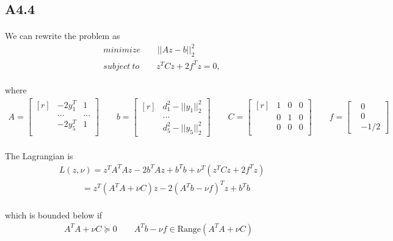 \subsection*{A4.4}
\paragraph{}
We can rewrite the problem as
\begin{align*}
&minimize \qquad ||Az - b||_2^2\\
&subject\ to \qquad z^TCz + 2f^Tz = 0,
\end{align*}
\paragraph{}
where
\begin{align*}
A = \begin{bmatrix*}[r]
&-2y_1^T & 1 \\ &...&...\\&-2y_5^T&1\\
\end{bmatrix*} \qquad b = \begin{bmatrix*}[r]
&d_1^2 - ||y_1||^2_2 \\ &... \\&d_5^2 - ||y_5||^2_2 
\end{bmatrix*}\qquad C = \begin{bmatrix*}[r]
&1 &0 &0 \\&0 &1 &0\\ &0 &0 &0\\
\end{bmatrix*} \qquad f=\begin{bmatrix}
&0\\&0\\&-1/2
\end{bmatrix}
\end{align*}
\paragraph{}
The Lagrangian is
\begin{align*}
&L(z, \nu) = z^TA^TAz -2b^TAz+ b^Tb +\nu^T(z^TCz + 2f^Tz) \\
&\qquad \ \ \  =z^T(A^TA+\nu C)z - 2(A^Tb-\nu f)^Tz+b^Tb
\end{align*}
\paragraph{}
which is bounded below if
\begin{align*}
A^TA +\nu C \succeq 0 \qquad A^Tb -\nu f \in \text{Range}(A^TA +\nu C)
\end{align*}
